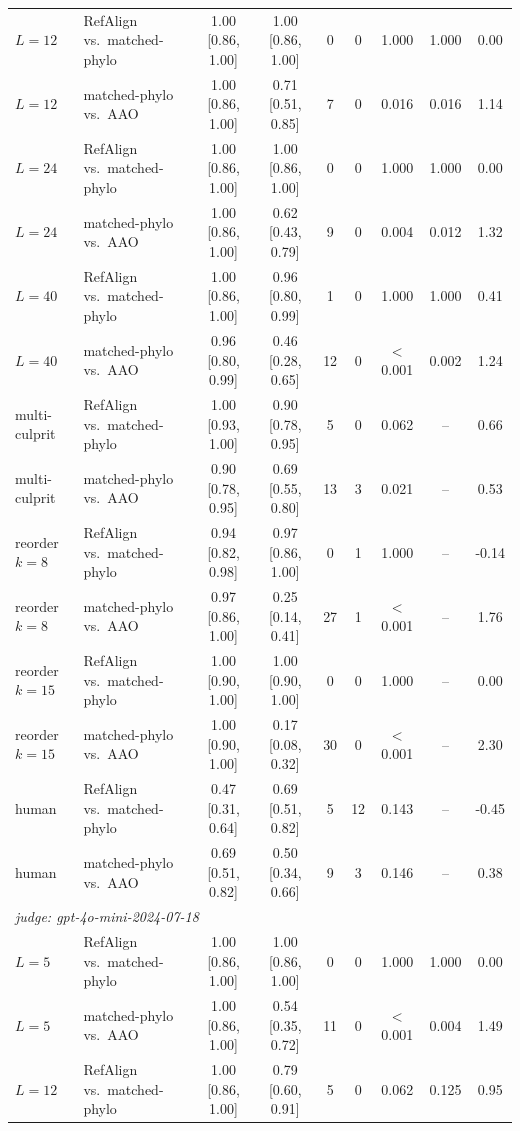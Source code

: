 \begin{table}[t]
\begin{tabular}{llccccccc}
$L{=}12$ & RefAlign vs.\ matched-phylo & 1.00 [0.86, 1.00] & 1.00 [0.86, 1.00] & 0 & 0 & 1.000 & 1.000 & 0.00 \\
$L{=}12$ & matched-phylo vs.\ AAO & 1.00 [0.86, 1.00] & 0.71 [0.51, 0.85] & 7 & 0 & 0.016 & 0.016 & 1.14 \\
$L{=}24$ & RefAlign vs.\ matched-phylo & 1.00 [0.86, 1.00] & 1.00 [0.86, 1.00] & 0 & 0 & 1.000 & 1.000 & 0.00 \\
$L{=}24$ & matched-phylo vs.\ AAO & 1.00 [0.86, 1.00] & 0.62 [0.43, 0.79] & 9 & 0 & 0.004 & 0.012 & 1.32 \\
$L{=}40$ & RefAlign vs.\ matched-phylo & 1.00 [0.86, 1.00] & 0.96 [0.80, 0.99] & 1 & 0 & 1.000 & 1.000 & 0.41 \\
$L{=}40$ & matched-phylo vs.\ AAO & 0.96 [0.80, 0.99] & 0.46 [0.28, 0.65] & 12 & 0 & $<$0.001 & 0.002 & 1.24 \\
multi-culprit & RefAlign vs.\ matched-phylo & 1.00 [0.93, 1.00] & 0.90 [0.78, 0.95] & 5 & 0 & 0.062 & -- & 0.66 \\
multi-culprit & matched-phylo vs.\ AAO & 0.90 [0.78, 0.95] & 0.69 [0.55, 0.80] & 13 & 3 & 0.021 & -- & 0.53 \\
reorder $k{=}8$ & RefAlign vs.\ matched-phylo & 0.94 [0.82, 0.98] & 0.97 [0.86, 1.00] & 0 & 1 & 1.000 & -- & -0.14 \\
reorder $k{=}8$ & matched-phylo vs.\ AAO & 0.97 [0.86, 1.00] & 0.25 [0.14, 0.41] & 27 & 1 & $<$0.001 & -- & 1.76 \\
reorder $k{=}15$ & RefAlign vs.\ matched-phylo & 1.00 [0.90, 1.00] & 1.00 [0.90, 1.00] & 0 & 0 & 1.000 & -- & 0.00 \\
reorder $k{=}15$ & matched-phylo vs.\ AAO & 1.00 [0.90, 1.00] & 0.17 [0.08, 0.32] & 30 & 0 & $<$0.001 & -- & 2.30 \\
human & RefAlign vs.\ matched-phylo & 0.47 [0.31, 0.64] & 0.69 [0.51, 0.82] & 5 & 12 & 0.143 & -- & -0.45 \\
human & matched-phylo vs.\ AAO & 0.69 [0.51, 0.82] & 0.50 [0.34, 0.66] & 9 & 3 & 0.146 & -- & 0.38 \\
\midrule
\multicolumn{9}{l}{\emph{judge: gpt-4o-mini-2024-07-18}} \\
$L{=}5$ & RefAlign vs.\ matched-phylo & 1.00 [0.86, 1.00] & 1.00 [0.86, 1.00] & 0 & 0 & 1.000 & 1.000 & 0.00 \\
$L{=}5$ & matched-phylo vs.\ AAO & 1.00 [0.86, 1.00] & 0.54 [0.35, 0.72] & 11 & 0 & $<$0.001 & 0.004 & 1.49 \\
$L{=}12$ & RefAlign vs.\ matched-phylo & 1.00 [0.86, 1.00] & 0.79 [0.60, 0.91] & 5 & 0 & 0.062 & 0.125 & 0.95 \\

\end{tabular}
\end{table}
